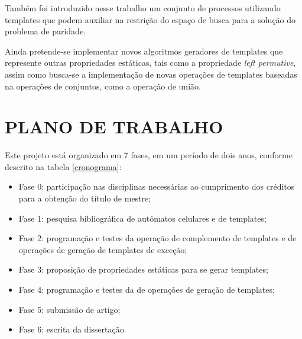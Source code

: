 \documentclass[12pt,a4paper]{article}
\let\stdsection\section
\renewcommand\section{\newpage\stdsection}
\begin{document}
Também foi introduzido nesse trabalho um conjunto de processos utilizando templates que podem auxiliar na restrição do espaço de busca para a solução do problema de paridade.

Ainda pretende-se implementar novos algoritmos geradores de templates que represente outras propriedades estáticas, tais como a propriedade \textit{left permutive}, assim como busca-se a implementação de novas operações de templates baseadas na operações de conjuntos, como a operação de união.

\section{PLANO DE TRABALHO}

Este projeto está organizado em 7 fases, em um período de dois anos, conforme descrito na tabela \ref{cronograma}:

  \begin{itemize}
      \item Fase 0: participação nas disciplinas necessárias ao cumprimento dos créditos para a obtenção do título de mestre;
      \item Fase 1: pesquisa bibliográfica de autômatos celulares e de templates;
      \item Fase 2: programação e testes da operação de complemento de templates e de operações de geração de templates de exceção;
      \item Fase 3: proposição de propriedades estáticas para se gerar templates;
      \item Fase 4: programação e testes da de operações de geração de templates;
      \item Fase 5: submissão de artigo;
      \item Fase 6: escrita da dissertação.
  \end{itemize}
\end{document}
